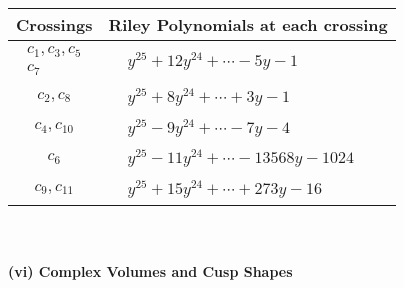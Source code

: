 \documentclass[1p]{elsarticle_modified}
\theoremstyle{definition}
\begin{document}
\begin{tabular}{m{50pt}|m{274pt}}
Crossings & \hspace{64pt}Riley Polynomials at each crossing \\
\hline $$\begin{aligned}c_{1},c_{3},c_{5}\\c_{7}\end{aligned}$$&$\begin{aligned}
&y^{25}+12 y^{24}+\cdots-5 y-1
\end{aligned}$\\
\hline $$\begin{aligned}c_{2},c_{8}\end{aligned}$$&$\begin{aligned}
&y^{25}+8 y^{24}+\cdots+3 y-1
\end{aligned}$\\
\hline $$\begin{aligned}c_{4},c_{10}\end{aligned}$$&$\begin{aligned}
&y^{25}-9 y^{24}+\cdots-7 y-4
\end{aligned}$\\
\hline $$\begin{aligned}c_{6}\end{aligned}$$&$\begin{aligned}
&y^{25}-11 y^{24}+\cdots-13568 y-1024
\end{aligned}$\\
\hline $$\begin{aligned}c_{9},c_{11}\end{aligned}$$&$\begin{aligned}
&y^{25}+15 y^{24}+\cdots+273 y-16
\end{aligned}$\\
\hline
\end{tabular}\\~\\
\newpage\flushleft \textbf{(vi) Complex Volumes and Cusp Shapes}
\end{document}
